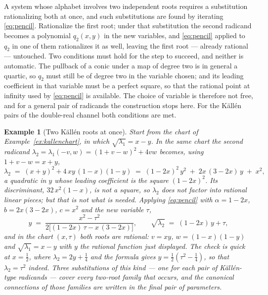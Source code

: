 \documentclass[11pt]{article}
\newtheorem{example}[definition]{Example}
\begin{document}
A system whose alphabet involves two independent roots requires a
substitution rationalizing both at once, and such substitutions are
found by iterating \eqref{eq:pencil}.  Rationalize the first root;
under that substitution the second radicand becomes a polynomial
$q_2(x,y)$ in the new variables, and \eqref{eq:pencil} applied to
$q_2$ in one of them rationalizes it as well, leaving the first root
--- already rational --- untouched.  Two conditions must hold for the
step to succeed, and neither is automatic.  The pullback of a conic
under a map of degree two is in general a quartic, so $q_2$ must
still be of degree two in the variable chosen; and its leading
coefficient in that variable must be a perfect square, so that the
rational point at infinity used by \eqref{eq:pencil} is available.
The choice of variable is therefore not free, and for a general pair
of radicands the construction stops here.  For the K\"all\'en pairs
of the double-real channel both conditions are met.

\begin{example}[Two K\"all\'en roots at once]
\label{ex:tworoots}
Start from the chart of Example~\ref{ex:kallenchart}, in which
$\sqrt{\lambda_1} = x-y$.  In the same chart the second radicand
$\lambda_2 = \lambda_1(-v,w) = (1+v-w)^2 + 4vw$ becomes, using
$1 + v - w = x+y$,
\begin{equation}
  \lambda_2 \;=\; (x+y)^2 + 4\,xy\,(1-x)(1-y)
  \;=\; (1-2x)^2\,y^2 \;+\; 2x\,(3-2x)\,y \;+\; x^2 ,
\end{equation}
a quadratic in $y$ whose leading coefficient is the square
$(1-2x)^2$.  Its discriminant, $32\,x^2(1-x)$, is not a square, so
$\lambda_2$ does not factor into rational linear pieces; but that is
not what is needed.  Applying \eqref{eq:pencil} with $\alpha = 1-2x$,
$b = 2x(3-2x)$, $c = x^2$ and the new variable $\tau$,
\begin{equation}
  y \;=\; \frac{x^2 - \tau^2}
  {2\big[(1-2x)\,\tau - x\,(3-2x)\big]} ,
  \qquad
  \sqrt{\lambda_2} \;=\; (1-2x)\,y + \tau ,
\end{equation}
and in the chart $(x,\tau)$ both roots are rational: $v = xy$,
$w = (1-x)(1-y)$ and $\sqrt{\lambda_1} = x - y$ with $y$ the rational
function just displayed.  The check is quick at $x = \tfrac12$, where
$\lambda_2 = 2y + \tfrac14$ and the formula gives
$y = \tfrac12(\tau^2 - \tfrac14)$, so that $\lambda_2 = \tau^2$
indeed.  Three substitutions of this kind --- one for each pair of
K\"all\'en-type radicands --- cover every two-root family that
occurs, and the canonical connections of those families are written
in the final pair of parameters.
\end{example}
\end{document}
